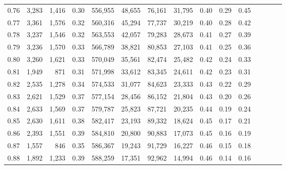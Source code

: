 \begin{tabular}{rrrcrrrrrrrrrrr}
0.76 &   3,283 &  1,416 &                                       0.30 &  556,955 &   48,655 &   76,161 &   31,795 &  0.40 &  0.29 &                         0.45 \\
0.77 &   3,361 &  1,576 &                                       0.32 &  560,316 &   45,294 &   77,737 &   30,219 &  0.40 &  0.28 &                         0.42 \\
0.78 &   3,237 &  1,546 &                                       0.32 &  563,553 &   42,057 &   79,283 &   28,673 &  0.41 &  0.27 &                         0.39 \\
0.79 &   3,236 &  1,570 &                                       0.33 &  566,789 &   38,821 &   80,853 &   27,103 &  0.41 &  0.25 &                         0.36 \\
0.80 &   3,260 &  1,621 &                                       0.33 &  570,049 &   35,561 &   82,474 &   25,482 &  0.42 &  0.24 &                         0.33 \\
0.81 &   1,949 &    871 &                                       0.31 &  571,998 &   33,612 &   83,345 &   24,611 &  0.42 &  0.23 &                         0.31 \\
0.82 &   2,535 &  1,278 &                                       0.34 &  574,533 &   31,077 &   84,623 &   23,333 &  0.43 &  0.22 &                         0.29 \\
0.83 &   2,621 &  1,529 &                                       0.37 &  577,154 &   28,456 &   86,152 &   21,804 &  0.43 &  0.20 &                         0.26 \\
0.84 &   2,633 &  1,569 &                                       0.37 &  579,787 &   25,823 &   87,721 &   20,235 &  0.44 &  0.19 &                         0.24 \\
0.85 &   2,630 &  1,611 &                                       0.38 &  582,417 &   23,193 &   89,332 &   18,624 &  0.45 &  0.17 &                         0.21 \\
0.86 &   2,393 &  1,551 &                                       0.39 &  584,810 &   20,800 &   90,883 &   17,073 &  0.45 &  0.16 &                         0.19 \\
0.87 &   1,557 &    846 &                                       0.35 &  586,367 &   19,243 &   91,729 &   16,227 &  0.46 &  0.15 &                         0.18 \\
0.88 &   1,892 &  1,233 &                                       0.39 &  588,259 &   17,351 &   92,962 &   14,994 &  0.46 &  0.14 &                         0.16 \\

\end{tabular}
